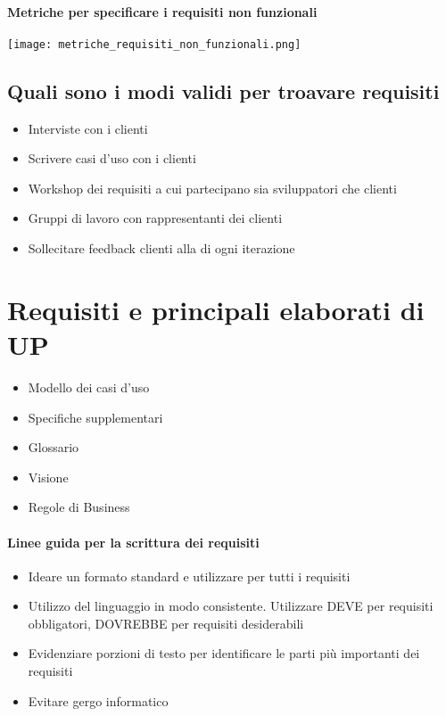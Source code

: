 \paragraph*{Metriche per specificare i requisiti non funzionali}
\begin{center}
    \texttt{[image: metriche\_requisiti\_non\_funzionali.png]}
\end{center}
\subsection{Quali sono i modi validi per troavare requisiti}
\begin{itemize}
    \item Interviste con i clienti
    \item Scrivere casi d'uso con i clienti
    \item Workshop dei requisiti a cui partecipano sia sviluppatori che clienti
    \item Gruppi di lavoro con rappresentanti dei clienti
    \item Sollecitare feedback clienti alla di ogni iterazione
\end{itemize}
\section{Requisiti e principali elaborati di UP}
\begin{itemize}
    \item Modello dei casi d'uso
    \item Specifiche supplementari
    \item Glossario
    \item Visione
    \item Regole di Business
\end{itemize}
\paragraph*{Linee guida per la scrittura dei requisiti}
\begin{itemize}
    \item Ideare un formato standard e utilizzare per tutti i requisiti
    \item Utilizzo del linguaggio in modo consistente. Utilizzare DEVE per requisiti
    obbligatori, DOVREBBE per requisiti desiderabili
    \item Evidenziare porzioni di testo per identificare le parti più importanti dei requisiti
    \item Evitare gergo informatico
\end{itemize}

